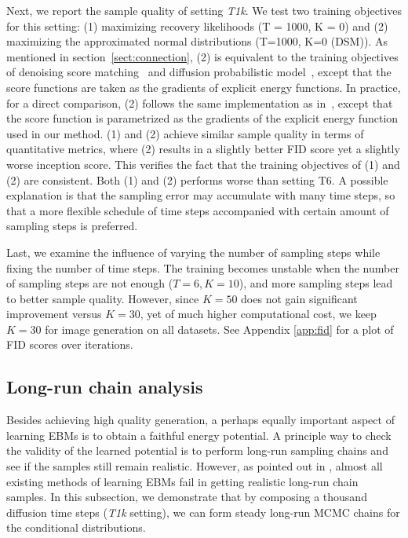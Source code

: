 \documentclass{article} \usepackage{iclr2021_conference,times}
\def\secref#1{section~\ref{#1}}
\begin{document}
Next, we report the sample quality of setting {\em T1k}. We test two training objectives for this setting: (1) maximizing recovery likelihoods (T = 1000, K = 0) and (2) maximizing the approximated normal distributions (T=1000, K=0 (DSM)). As mentioned in \secref{sect:connection}, (2) is equivalent to the training objectives of denoising score matching~\citep{song2019generative,song2020improved} and diffusion probabilistic model~\citep{ho2020denoising}, except that the score functions are taken as the gradients of explicit energy functions. In practice, for a direct comparison, (2) follows the same implementation as in~\cite{ho2020denoising}, except that the score function is parametrized as the gradients of the explicit energy function used in our method. (1) and (2) achieve similar sample quality in terms of quantitative metrics, where (2) results in a slightly better FID score yet a slightly worse inception score. This verifies the fact that the training objectives of (1) and (2) are consistent. Both (1) and (2) performs worse than setting T6. A possible explanation is that the sampling error may accumulate with many time steps, so that a more flexible schedule of time steps accompanied with certain amount of sampling  steps is preferred. 

Last, we examine the influence of varying the number of sampling steps while fixing the number of time steps. The training becomes unstable when the number of sampling steps are not enough ($T=6, K=10$), and more sampling steps lead to better sample quality. However, since $K = 50$ does not gain significant improvement versus $K = 30$, yet of much higher computational cost, we keep $K = 30$ for image generation on all datasets. See Appendix \ref{app:fid} for a plot of FID scores over iterations. 

\subsection{Long-run chain analysis} \label{sect:long-run}
Besides achieving high quality generation, a perhaps equally important aspect of learning EBMs is to obtain a faithful energy potential. A principle way to check the validity of the learned potential is to perform long-run sampling chains and see if the samples still remain realistic. However, as pointed out in \citet{nijkamp2019anatomy}, almost all existing methods of learning EBMs fail in getting realistic long-run chain samples.  In this subsection, we demonstrate that by composing a thousand diffusion time steps ({\em T1k} setting), we can form steady long-run MCMC chains for the conditional distributions.  
\end{document}
